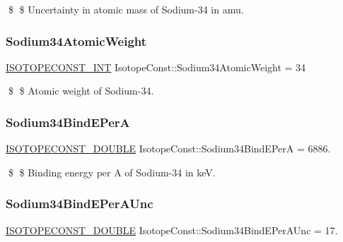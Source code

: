 \$ \$ Uncertainty in atomic mass of Sodium-\/34 in amu. \mbox{\label{group___isotope_const-_sodium-_na34_gaa299261ca8c0f3f7ad3e13040160c8b3}} 
\subsubsection{\texorpdfstring{Sodium34\+Atomic\+Weight}{Sodium34AtomicWeight}}
{\footnotesize\ttfamily \mbox{\hyperlink{group___isotope_const-_macros_ga5f18360b3e99483a35c32d789e62621c}{I\+S\+O\+T\+O\+P\+E\+C\+O\+N\+S\+T\+\_\+\+I\+NT}} Isotope\+Const\+::\+Sodium34\+Atomic\+Weight = 34}

\$ \$ Atomic weight of Sodium-\/34. \mbox{\label{group___isotope_const-_sodium-_na34_gac963f5023fc2413122b9eb3f1f18a608}} 
\subsubsection{\texorpdfstring{Sodium34\+Bind\+E\+PerA}{Sodium34BindEPerA}}
{\footnotesize\ttfamily \mbox{\hyperlink{group___isotope_const-_macros_ga8f45a7272ce02c0b4c65c44636ed719a}{I\+S\+O\+T\+O\+P\+E\+C\+O\+N\+S\+T\+\_\+\+D\+O\+U\+B\+LE}} Isotope\+Const\+::\+Sodium34\+Bind\+E\+PerA = 6886.}

\$ \$ Binding energy per A of Sodium-\/34 in keV. \mbox{\label{group___isotope_const-_sodium-_na34_ga25df1c02922124530fd22e9486b8b3c4}} 
\subsubsection{\texorpdfstring{Sodium34\+Bind\+E\+Per\+A\+Unc}{Sodium34BindEPerAUnc}}
{\footnotesize\ttfamily \mbox{\hyperlink{group___isotope_const-_macros_ga8f45a7272ce02c0b4c65c44636ed719a}{I\+S\+O\+T\+O\+P\+E\+C\+O\+N\+S\+T\+\_\+\+D\+O\+U\+B\+LE}} Isotope\+Const\+::\+Sodium34\+Bind\+E\+Per\+A\+Unc = 17.}

